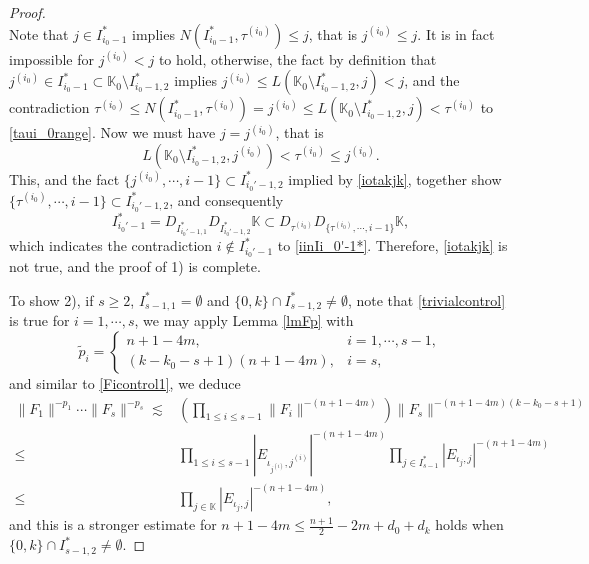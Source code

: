 \documentclass[11pt,reqno]{amsart}
\numberwithin{equation}{section}
\theoremstyle{definition}
\begin{document}
\begin{proof}
\begin{equation}
	\end{equation}
	Note that $j\in I_{i_0-1}^*$ implies $N(I_{i_0-1}^*,\tau^{(i_0)})\leq j$, that is $j^{(i_0)}\leq j$. It is in fact impossible for $j^{(i_0)}<j$ to hold, otherwise, the fact by definition that $j^{(i_0)}\in I_{i_0-1}^*\subset\mathbb{K}_0\setminus I_{i_0-1,2}^*$ implies $j^{(i_0)}\leq L(\mathbb{K}_0\setminus I_{i_0-1,2}^*,j)<j$, and the contradiction $\tau^{(i_0)}\leq N(I_{i_0-1}^*,\tau^{(i_0)})=j^{(i_0)}\leq L(\mathbb{K}_0\setminus I_{i_0-1,2}^*,j)<\tau^{(i_0)}$ to \eqref{taui_0range}. Now we must have $j=j^{(i_0)}$, that is
	\begin{equation*}
		L(\mathbb{K}_0\setminus I_{i_0-1,2}^*,j^{(i_0)})<\tau^{(i_0)}\leq j^{(i_0)}.
	\end{equation*}
	This, and the fact $\{j^{(i_0)},\cdots,i-1\}\subset I_{i_0'-1,2}^*$ implied by \eqref{iotakjk}, together show $\{\tau^{(i_0)},\cdots,i-1\}\subset I_{i_0'-1,2}^*$, and consequently
	\begin{equation*}
		I_{i_0'-1}^*=D_{I_{i_0'-1,1}^*}D_{I_{i_0'-1,2}^*}\mathbb{K}\subset D_{\tau^{(i_0)}}D_{\{\tau^{(i_0)},\cdots,i-1\}}\mathbb{K},
	\end{equation*}
	which indicates the contradiction $i\notin I_{i_0'-1}^*$ to \eqref{iinIi_0'-1*}. Therefore, \eqref{iotakjk} is not true, and the proof of 1) is complete.
	
	
	
	
	To show 2), if $s\geq2$, $I_{s-1,1}^*=\emptyset$ and $\{0,k\}\cap I_{s-1,2}^*\neq\emptyset$, note that \eqref{trivialcontrol} is true for $i=1,\cdots,s$, we may apply Lemma \ref{lmFp} with
	\begin{equation*}
		\tilde{p}_i=\begin{cases}
			n+1-4m,\quad&i=1,\cdots,s-1,\\
			(k-k_0-s+1)(n+1-4m),&i=s,
		\end{cases}
	\end{equation*}
	and similar to \eqref{Ficontrol1}, we deduce
	\begin{equation*}
		\begin{split}
			\|F_1\|^{-p_1}\cdots\|F_s\|^{-p_s}\lesssim&\left(\prod_{1\leq i\leq s-1}\|F_i\|^{-(n+1-4m)}\right)\|F_s\|^{-(n+1-4m)(k-k_0-s+1)}\\
			\leq&\prod_{1\leq i\leq s-1}|E_{\iota_{j^{(i)}},j^{(i)}}|^{-(n+1-4m)}\prod_{j\in I_{s-1}^*}|E_{\iota_j,j}|^{-(n+1-4m)}\\
			\leq&\prod_{j\in\mathbb{K}}|E_{\iota_j,j}|^{-(n+1-4m)},
		\end{split}
	\end{equation*}
	and this is a stronger estimate for $n+1-4m\leq\frac{n+1}{2}-2m+d_0+d_k$ holds when $\{0,k\}\cap I_{s-1,2}^*\neq\emptyset$.
	

\end{proof}
\end{document}

